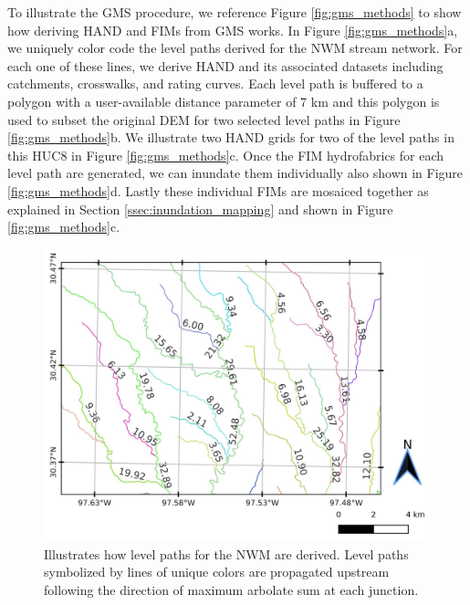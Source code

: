 To illustrate the GMS procedure, we reference Figure \ref{fig:gms_methods} to show how deriving HAND and FIMs from GMS works.
In Figure \ref{fig:gms_methods}a, we uniquely color code the level paths derived for the NWM stream network. 
For each one of these lines, we derive HAND and its associated datasets including catchments, crosswalks, and rating curves.
Each level path is buffered to a polygon with a user-available distance parameter of 7 km and this polygon is used to subset the original DEM for two selected level paths in Figure \ref{fig:gms_methods}b.
We illustrate two HAND grids for two of the level paths in this HUC8 in Figure \ref{fig:gms_methods}c.
Once the FIM hydrofabrics for each level path are generated, we can inundate them individually also shown in Figure \ref{fig:gms_methods}d.
Lastly these individual FIMs are mosaiced together as explained in Section \ref{ssec:inundation_mapping} and shown in Figure \ref{fig:gms_methods}c.
%
\begin{figure}[h!]
\centering
\includegraphics[scale=1.0]{figures/level_path_methods.jpg}
\caption{Illustrates how level paths for the NWM are derived.
Level paths symbolized by lines of unique colors are propagated upstream following the direction of maximum arbolate sum at each junction.
}
\label{fig:level_path_methods}
\end{figure}
%
%
